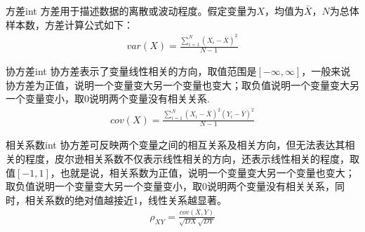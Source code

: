 \begin{definition}{方差}{int}
方差用于描述数据的离散或波动程度。假定变量为$X$，均值为$\bar{X}$，$N$为总体样本数，方差计算公式如下：
\begin{align}
var(X) = \frac{\sum_{i=1}^{N}(X_i-\bar{X})^{2}}{N-1}
\end{align}
\end{definition}

\begin{definition}{协方差}{int}
协方差表示了变量线性相关的方向，取值范围是$[-\infty, \infty]$，一般来说协方差为正值，说明一个变量变大另一个变量也变大；取负值说明一个变量变大另一个变量变小，取0说明两个变量没有相关关系.
\begin{align}
cov(X) = \frac{\sum_{i=1}^{N}(X_i-\bar{X})^{2}(Y_i-\bar{Y})^{2}}{N-1}
\end{align}
\end{definition}

\begin{definition}{相关系数}{int}
协方差可反映两个变量之间的相互关系及相关方向，但无法表达其相关的程度，皮尔逊相关系数不仅表示线性相关的方向，还表示线性相关的程度，取值$[-1,1]$，也就是说，相关系数为正值，说明一个变量变大另一个变量也变大；取负值说明一个变量变大另一个变量变小，取0说明两个变量没有相关关系，同时，相关系数的绝对值越接近1，线性关系越显著。
\begin{align}
\rho_{XY} = \frac{cov(X, Y)}{\sqrt{DX}\sqrt{DY}}
\end{align}
\end{definition}

\begin{definition}{协方差矩阵}{int}
 当$X\in{R^{n}$为高维数据时，协方差矩阵可以很好的反映数据的性质，在协方差矩阵中，对角线元素反映了数据在各个维度上的离散程度，协方差矩阵为对角阵，非对角线元素反映了数据各个维度的相关性，其形式如下:
\begin{align}
\Sigma = 
\begin{bmatrix}
cov(x_1, x_1) & cov(x_1, x_2) & \cdots & cov(x_1, x_n) \\
cov(x_2, x_1) & cov(x_2, x_2) & \cdots & cov(x_2, x_n) \\
\vdots        & \vdots        & \ddots    & \vdots \\
cov(x_n, x_1) & cov(x_n, x_2) & \cdots & cov(x_n, x_n) 
\end{bmatrix}
\end{align}
\end{definition}

